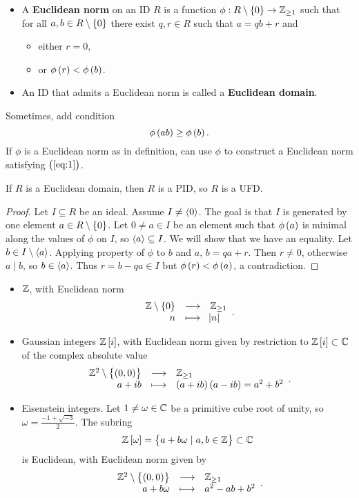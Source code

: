 \begin{definition}
\hfill
\begin{itemize}
\item A \textbf{Euclidean norm} on an ID $ R $ is a function $ \phi : R \setminus \cbr{0} \to \Z_{\ge 1} $ such that for all $ a, b \in R \setminus \cbr{0} $ there exist $ q, r \in R $ such that $ a = qb + r $ and
\begin{itemize}
\item either $ r = 0 $,
\item or $ \phi\br{r} < \phi\br{b} $.
\end{itemize}
\item An ID that admits a Euclidean norm is called a \textbf{Euclidean domain}.
\end{itemize}
\end{definition}

Sometimes, add condition
\begin{equation}
\label{eq:1}
\phi\br{ab} \ge \phi\br{b}.
\end{equation}
If $ \phi $ is a Euclidean norm as in definition, can use $ \phi $ to construct a Euclidean norm satisfying $ \br{\ref{eq:1}} $.

\begin{theorem}
If $ R $ is a Euclidean domain, then $ R $ is a PID, so $ R $ is a UFD.
\end{theorem}


\begin{proof}
Let $ I \subseteq R $ be an ideal. Assume $ I \ne \left\langle 0 \right\rangle $. The goal is that $ I $ is generated by one element $ a \in R \setminus \cbr{0} $. Let $ 0 \ne a \in I $ be an element such that $ \phi\br{a} $ is minimal along the values of $ \phi $ on $ I $, so $ \left\langle a \right\rangle \subseteq I $. We will show that we have an equality. Let $ b \in I \setminus \left\langle a \right\rangle $. Applying property of $ \phi $ to $ b $ and $ a $, $ b = qa + r $. Then $ r \ne 0 $, otherwise $ a \mid b $, so $ b \in \left\langle a \right\rangle $. Thus $ r = b - qa \in I $ but $ \phi\br{r} < \phi\br{a} $, a contradiction.
\end{proof}

\begin{example*}
\hfill
\begin{itemize}
\item $ \mathbb{Z} $, with Euclidean norm
$$ \function{\Z \setminus \cbr{0}}{\Z_{\ge 1}}{n}{\abs{n}}. $$
\item Gaussian integers $ \Z\sbr{i} $, with Euclidean norm given by restriction to $ \Z\sbr{i} \subset \C $ of the complex absolute value
$$ \function{\Z^2 \setminus \cbr{\br{0, 0}}}{\Z_{\ge 1}}{a + ib}{\br{a + ib}\br{a - ib} = a^2 + b^2}. $$
\item Eisenstein integers. Let $ 1 \ne \omega \in \mathbb{C} $ be a primitive cube root of unity, so $ \omega = \tfrac{-1 + \sqrt{-3}}{2} $. The subring
$$ \Z\sbr{\omega} = \cbr{a + b\omega \mid a, b \in \Z} \subset \C $$
is Euclidean, with Euclidean norm given by
$$ \function{\Z^2 \setminus \cbr{\br{0, 0}}}{\Z_{\ge 1}}{a + b\omega}{a^2 - ab + b^2}. $$
\end{itemize}
\end{example*}

